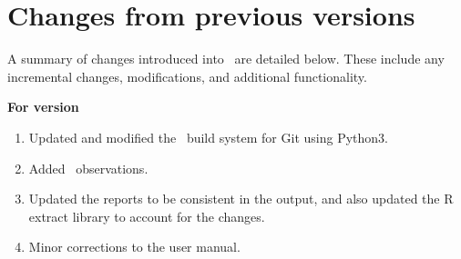 \section{Changes from previous versions}

A summary of changes introduced into \SPM\ are detailed below. These include any incremental changes, modifications, and additional functionality.

\textbf{For version \SPM\ \VER}

\begin{enumerate}
  \item Updated and modified the \SPM\ build system for Git using Python3.
  \item Added\   observations.
  \item Updated the reports to be consistent in the output, and also updated the R extract library to account for the changes.
  \item Minor corrections to the user manual.
\end{enumerate}

